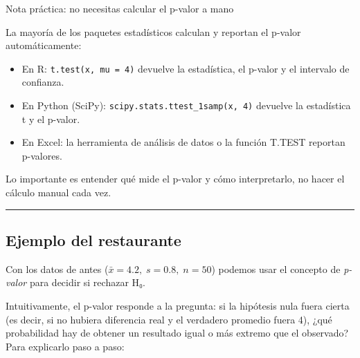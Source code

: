 \documentclass[
  spanish,
  letterpaper,
  DIV=11,
  numbers=noendperiod]{scrreprt}
\providecommand{\tightlist}{%
  \setlength{\itemsep}{0pt}\setlength{\parskip}{0pt}}
\begin{document}
\begin{tcolorbox}[enhanced jigsaw, toptitle=1mm, opacitybacktitle=0.6, leftrule=.75mm, arc=.35mm, title=\textcolor{quarto-callout-note-color}{\faInfo}\hspace{0.5em}{Nota}, colback=white, bottomrule=.15mm, colbacktitle=quarto-callout-note-color!10!white, opacityback=0, bottomtitle=1mm, breakable, rightrule=.15mm, coltitle=black, left=2mm, titlerule=0mm, colframe=quarto-callout-note-color-frame, toprule=.15mm]

Nota práctica: no necesitas calcular el p-valor a mano

La mayoría de los paquetes estadísticos calculan y reportan el p-valor
automáticamente:

\begin{itemize}
\tightlist
\item
  En R: \texttt{t.test(x,\ mu\ =\ 4)} devuelve la estadística, el
  p-valor y el intervalo de confianza.
\item
  En Python (SciPy): \texttt{scipy.stats.ttest\_1samp(x,\ 4)} devuelve
  la estadística t y el p-valor.
\item
  En Excel: la herramienta de análisis de datos o la función T.TEST
  reportan p-valores.
\end{itemize}

Lo importante es entender qué mide el p-valor y cómo interpretarlo, no
hacer el cálculo manual cada vez.

\end{tcolorbox}

\begin{center}\rule{0.5\linewidth}{0.5pt}\end{center}

\subsection{Ejemplo del restaurante}\label{ejemplo-del-restaurante-1}

Con los datos de antes (\(\bar{x}=4.2,\; s=0.8,\; n=50\)) podemos usar
el concepto de \emph{p-valor} para decidir si rechazar H₀.

Intuitivamente, el p-valor responde a la pregunta: si la hipótesis nula
fuera cierta (es decir, si no hubiera diferencia real y el verdadero
promedio fuera 4), ¿qué probabilidad hay de obtener un resultado igual o
más extremo que el observado? Para explicarlo paso a paso:
\end{document}
